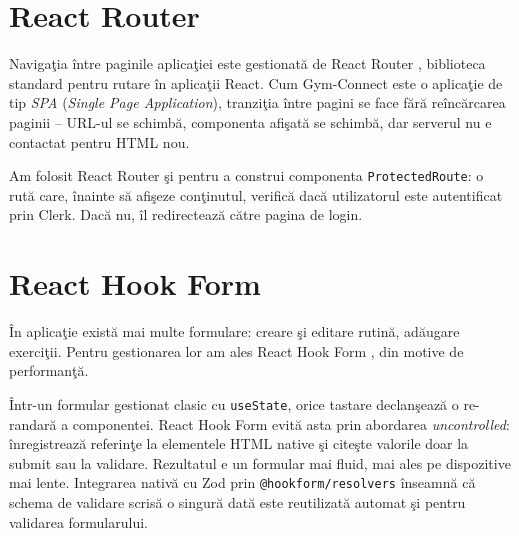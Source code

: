 \section{React Router}

Naviga\c tia \^ intre paginile aplica\c tiei este gestionat\u a
de React Router \cite{reactrouter2024}, biblioteca
standard pentru rutare \^ in aplica\c tii React. Cum
Gym-Connect este o aplica\c tie de tip \textit{SPA}
(\textit{Single Page Application}), tranzi\c tia \^ intre
pagini se face f\u ar\u a re\^ inc\u arcarea paginii --
URL-ul se schimb\u a, componenta afi\c sat\u a se
schimb\u a, dar serverul nu e contactat pentru HTML nou.

Am folosit React Router \c si pentru a construi
componenta \texttt{ProtectedRoute}: o rut\u a care,
\^ inainte s\u a afi\c seze con\c tinutul, verific\u a
dac\u a utilizatorul este autentificat prin Clerk.
Dac\u a nu, \^ il redirecteaz\u a c\u atre pagina de login.

\section{React Hook Form}

\^ In aplica\c tie exist\u a mai multe formulare: creare
\c si editare rutin\u a, ad\u augare exerci\c tii. Pentru
gestionarea lor am ales React Hook Form
\cite{reacthookform2024}, din motive de performan\c t\u a.

\^ Intr-un formular gestionat clasic cu \texttt{useState},
orice tastare declan\c seaz\u a o re-randar\u a a
componentei. React Hook Form evit\u a asta prin abordarea
\textit{uncontrolled}: \^ inregistreaz\u a referin\c te
la elementele HTML native \c si cite\c ste valorile doar
la submit sau la validare. Rezultatul e un formular mai
fluid, mai ales pe dispozitive mai lente. Integrarea
nativ\u a cu Zod prin \texttt{@hookform/resolvers}
\^ inseamn\u a c\u a schema de validare scris\u a o
singur\u a dat\u a este reutilizat\u a automat \c si
pentru validarea formularului.
